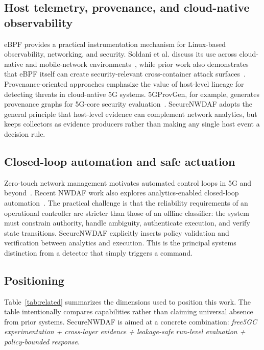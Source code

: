 \documentclass[sigconf,review]{acmart}
\begin{document}
\subsection{Host telemetry, provenance, and cloud-native observability}
eBPF provides a practical instrumentation mechanism for Linux-based observability, networking, and security. Soldani et al. discuss its use across cloud-native and mobile-network environments~\cite{ebpf}, while prior work also demonstrates that eBPF itself can create security-relevant cross-container attack surfaces~\cite{crosscontainer}. Provenance-oriented approaches emphasize the value of host-level lineage for detecting threats in cloud-native 5G systems. 5GProvGen, for example, generates provenance graphs for 5G-core security evaluation~\cite{5gprovgen}. SecureNWDAF adopts the general principle that host-level evidence can complement network analytics, but keeps collectors as evidence producers rather than making any single host event a decision rule.

\subsection{Closed-loop automation and safe actuation}
Zero-touch network management motivates automated control loops in 5G and beyond~\cite{benzaid2020}. Recent NWDAF work also explores analytics-enabled closed-loop automation~\cite{ardestani2026}. The practical challenge is that the reliability requirements of an operational controller are stricter than those of an offline classifier: the system must constrain authority, handle ambiguity, authenticate execution, and verify state transitions. SecureNWDAF explicitly inserts policy validation and verification between analytics and execution. This is the principal systems distinction from a detector that simply triggers a command.

\subsection{Positioning}
Table~\ref{tab:related} summarizes the dimensions used to position this work. The table intentionally compares capabilities rather than claiming universal absence from prior systems. SecureNWDAF is aimed at a concrete combination: \emph{free5GC experimentation + cross-layer evidence + leakage-safe run-level evaluation + policy-bounded response}.
\end{document}
